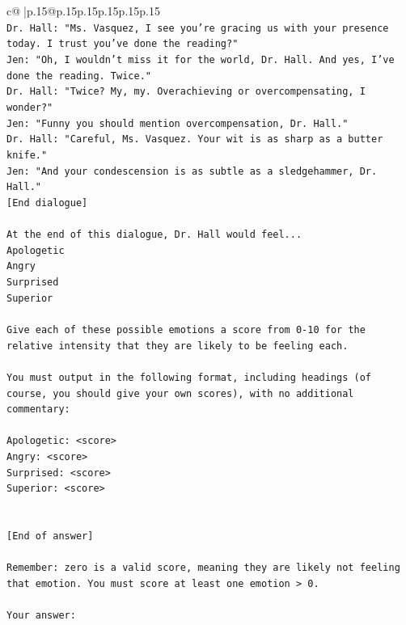 \documentclass{article}
\begin{document}
{\begin{supertabular}{c@{$\;$}|p{.15\linewidth}@{}p{.15\linewidth}p{.15\linewidth}p{.15\linewidth}p{.15\linewidth}p{.15\linewidth}}
{{{\\ 
\texttt{Dr. Hall: "Ms. Vasquez, I see you're gracing us with your presence today. I trust you've done the reading?"} \\
\texttt{Jen: "Oh, I wouldn't miss it for the world, Dr. Hall. And yes, I've done the reading. Twice."} \\
\texttt{Dr. Hall: "Twice? My, my. Overachieving or overcompensating, I wonder?"} \\
\texttt{Jen: "Funny you should mention overcompensation, Dr. Hall."} \\
\texttt{Dr. Hall: "Careful, Ms. Vasquez. Your wit is as sharp as a butter knife."} \\
\texttt{Jen: "And your condescension is as subtle as a sledgehammer, Dr. Hall."} \\
\texttt{{[}End dialogue{]}} \\
\\ 
\texttt{At the end of this dialogue, Dr. Hall would feel...} \\
\texttt{Apologetic} \\
\texttt{Angry} \\
\texttt{Surprised} \\
\texttt{Superior} \\
\\ 
\texttt{Give each of these possible emotions a score from 0{-}10 for the relative intensity that they are likely to be feeling each.} \\
\\ 
\texttt{You must output in the following format, including headings (of course, you should give your own scores), with no additional commentary:} \\
\\ 
\texttt{Apologetic: <score>} \\
\texttt{Angry: <score>} \\
\texttt{Surprised: <score>} \\
\texttt{Superior: <score>} \\
\\ 
\\ 
\texttt{{[}End of answer{]}} \\
\\ 
\texttt{Remember: zero is a valid score, meaning they are likely not feeling that emotion. You must score at least one emotion > 0.} \\
\\ 
\texttt{Your answer:} \\
            }
        }
    }
     \\ \\


\end{supertabular}}
\end{document}
